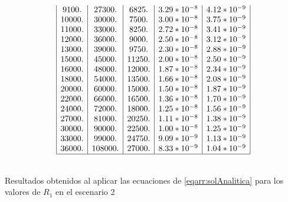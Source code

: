 \documentclass{llncs}
\begin{document}
\begin{table}[!h]
\begin{minipage}{0.5\textwidth}
$$\begin{array}{|c|c|c|c|c|}
		9100. & 27300. & 6825.    & 3.29*10^{-8} & 4.12*10^{-9} \\
		10000. & 30000. & 7500.   & 3.00*10^{-8} & 3.75*10^{-9} \\
		11000. & 33000. & 8250.   & 2.72*10^{-8} & 3.41*10^{-9} \\
		12000. & 36000. & 9000.   & 2.50*10^{-8} & 3.12*10^{-9} \\
		13000. & 39000. & 9750.   & 2.30*10^{-8} & 2.88*10^{-9} \\
		15000. & 45000. & 11250.  & 2.00*10^{-8} & 2.50*10^{-9} \\
		16000. & 48000. & 12000.  & 1.87*10^{-8} & 2.34*10^{-9} \\
		18000. & 54000. & 13500.  & 1.66*10^{-8} & 2.08*10^{-9} \\
		20000. & 60000. & 15000.  & 1.50*10^{-8} & 1.87*10^{-9} \\
		22000. & 66000. & 16500.  & 1.36*10^{-8} & 1.70*10^{-9} \\
		24000. & 72000. & 18000.  & 1.25*10^{-8} & 1.56*10^{-9} \\
		27000. & 81000. & 20250.  & 1.11*10^{-8} & 1.38*10^{-9} \\
		30000. & 90000. & 22500.  & 1.00*10^{-8} & 1.25*10^{-9} \\
		33000. & 99000. & 24750.  & 9.09*10^{-9} & 1.13*10^{-9} \\
		36000. & 108000. & 27000. & 8.33*10^{-9} & 1.04*10^{-9} \\
		\hline
		\end{array}
		$$
          \end{minipage} \hfill\\
          
		\caption{Resultados obtenidos al aplicar las ecuaciones de \ref{eqarr:solAnalitica} para los valores de $R_1$ en el escenario 2}
                \label{cuadro1}
	\end{table}
\end{document}
